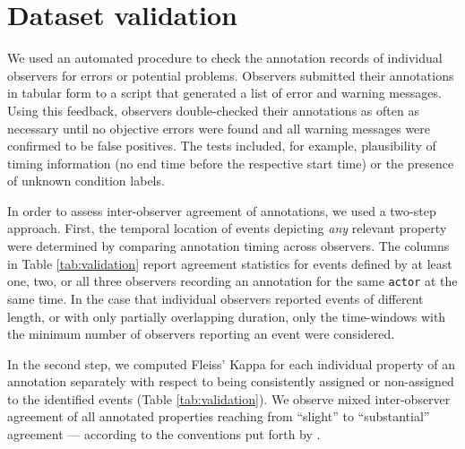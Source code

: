 \documentclass[10pt,a4paper,twocolumn]{article}
\begin{document}
\section*{Dataset validation}


We used an automated procedure to check the annotation records of individual
observers for errors or potential problems. Observers submitted their
annotations in tabular form to a script that generated a list of error and
warning messages. Using this feedback, observers double-checked their
annotations as often as necessary until no objective errors were found and all
warning messages were confirmed to be false positives. The tests included, for
example, plausibility of timing information (no end time before the respective
start time) or the presence of unknown condition labels.

In order to assess inter-observer agreement of annotations, we used a two-step
approach. First, the temporal location of events depicting \textit{any}
relevant property were determined by comparing annotation timing across
observers. The columns in Table \ref{tab:validation} report agreement
statistics for events defined by at least one, two, or all three observers
recording an annotation for the same \texttt{actor} at the same time. In the
case that individual observers reported events of different length, or with
only partially overlapping duration, only the time-windows with the minimum
number of observers reporting an event were considered.

In the second step, we computed Fleiss' Kappa \citep{Fle71} for each individual
property of an annotation separately with respect to being consistently
assigned or non-assigned to the identified events (Table \ref{tab:validation}).
We observe mixed inter-observer agreement of all annotated properties reaching from ``slight'' to
``substantial'' agreement — according to the conventions put forth by
\cite{LK77}.






\end{document}

